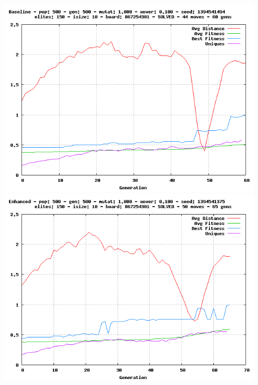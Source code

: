 \documentclass[]{article}
\begin{document}
\includegraphics{img/3.png} \includegraphics{img/4.png}
\end{document}

